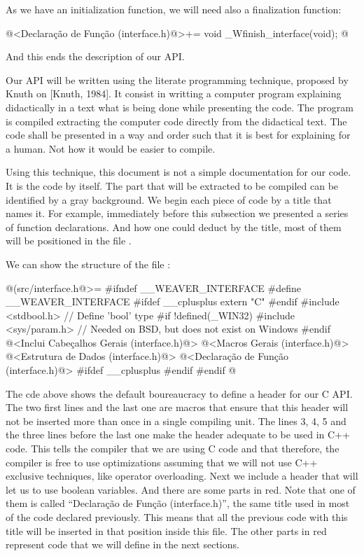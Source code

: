 As we have an initialization function, we will need also a
finalization function:

\iniciocodigo
@<Declaração de Função (interface.h)@>+=
void _Wfinish_interface(void);
@
\fimcodigo

And this ends the description of our API.


Our API will be written using the literate programming technique,
proposed by Knuth on [Knuth, 1984]. It consist in writting a computer
program explaining didactically in a text what is being done while
presenting the code. The program is compiled extracting the computer
code directly from the didactical text. The code shall be presented in
a way and order such that it is best for explaining for a human. Not
how it would be easier to compile.

Using this technique, this document is not a simple documentation for
our code. It is the code by itself. The part that will be extracted to
be compiled can be identified by a gray background. We begin each
piece of code by a title that names it. For example, immediately
before this subsection we presented a series of function
declarations. And how one could deduct by the title, most of them will
be positioned in the file .

We can show the structure of the file :

\iniciocodigo
@(src/interface.h@>=
#ifndef __WEAVER_INTERFACE
#define __WEAVER_INTERFACE
#ifdef __cplusplus
extern "C" {
#endif
#include <stdbool.h> // Define  'bool' type
#if !defined(_WIN32)
#include <sys/param.h> // Needed on BSD, but does not exist on Windows
#endif  
@<Inclui Cabeçalhos Gerais (interface.h)@>
@<Macros Gerais (interface.h)@>
@<Estrutura de Dados (interface.h)@>
@<Declaração de Função (interface.h)@>
#ifdef __cplusplus
}
#endif
#endif
@
\fimcodigo

The cde above shows the default boureaucracy to define a header for
our C API. The two first lines and the last one are macros that ensure
that this header will not be inserted more than once in a single
compiling unit. The lines 3, 4, 5 and the three lines before the last
one make the header adequate to be used in C++ code. This tells the
compiler that we are using C code and that therefore, the compiler is
free to use optimizations assuming that we will not use C++ exclusive
techniques, like operator overloading. Next we include a header that
will let us to use boolean variables. And there are some parts in
red. Note that one of them is called ``Declaração de Função
(interface.h)'', the same title used in most of the code declared
previously. This means that all the previous code with this title will
be inserted in that position inside this file. The other parts in red
represent code that we will define in the next sections.

